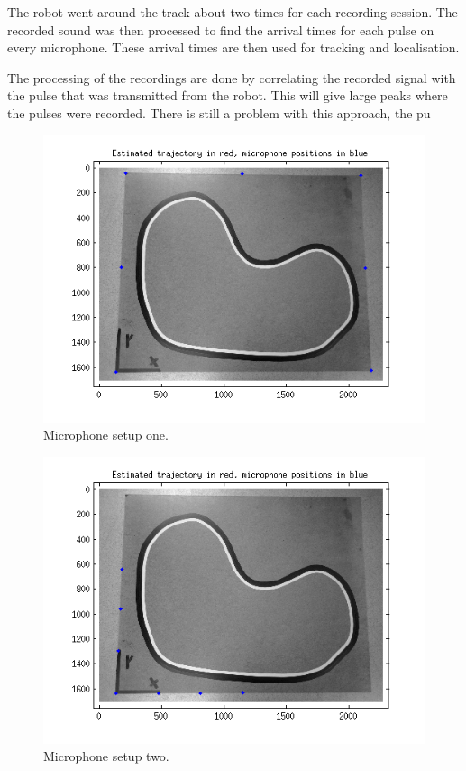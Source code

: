 \documentclass[10pt,a4paper]{report}
\begin{document}
The robot went around the track about two times for each recording session.
The recorded sound was then processed to find the arrival times for each pulse on every microphone.
These arrival times are then used for tracking and localisation.

The processing of the recordings are done by correlating the recorded signal with the pulse that was transmitted from the robot.
This will give large peaks where the pulses were recorded.
There is still a problem with this approach, the pu

\begin{figure}[!h]

  \label{good_setup}
  \includegraphics[scale=0.9]{microphone_pos_good.png}
  \caption{Microphone setup one.}
\end{figure}

\begin{figure}[!h]
  \label{bad_setup}
  \includegraphics[scale=0.9]{microphone_pos_bad.png}
  \caption{Microphone setup two.}
\end{figure}
\end{document}
